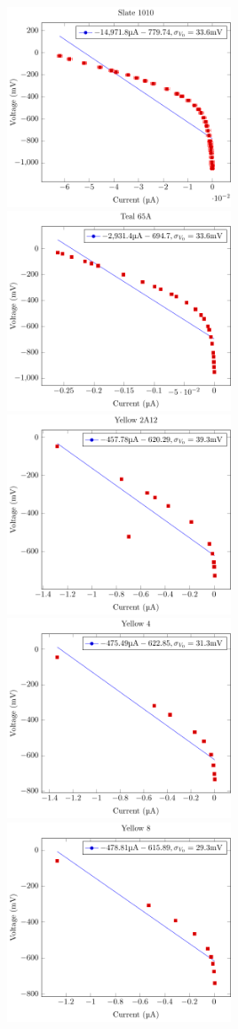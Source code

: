 \documentclass[a4paper]{article}
\begin{document}
\includegraphics[width=0.5\textwidth]{P1-PlanksConstant/Plots/Slate1010/slate1010.pdf}
\includegraphics[width=0.5\textwidth]{P1-PlanksConstant/Plots/Teal65A/teal65A.pdf}
\includegraphics[width=0.5\textwidth]{P1-PlanksConstant/Plots/Yellow2A12/yellow2A12.pdf}
\includegraphics[width=0.5\textwidth]{P1-PlanksConstant/Plots/Yellow4/yellow4.pdf}
\includegraphics[width=0.5\textwidth]{P1-PlanksConstant/Plots/Yellow8/yellow8.pdf}
\end{document}

